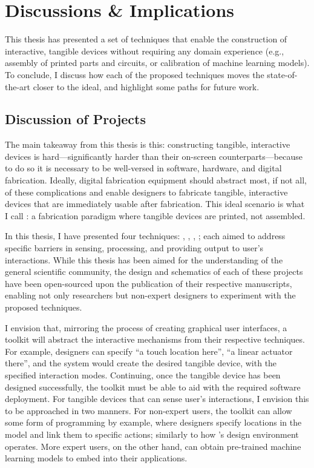 \chapter{Discussions \& Implications} \label{ch:discussion}
  This thesis has presented a set of techniques that enable the construction of
  interactive, tangible devices without requiring any domain experience (e.g.,
  assembly of printed parts and circuits, or calibration of machine learning
  models). To conclude, I discuss how each of the proposed techniques moves
  the state-of-the-art closer to the \papf ideal, and highlight some paths for
  future work.

  \section{Discussion of Projects}
    The main takeaway from this thesis is this: constructing tangible,
    interactive devices is hard---significantly harder than their on-screen
    counterparts---because to do so it is necessary to be well-versed in
    software, hardware, and digital fabrication. Ideally, digital fabrication
    equipment should abstract most, if not all, of these complications and
    enable designers to fabricate tangible, interactive devices that are
    immediately usable after fabrication. This ideal scenario is what I call
    \emph{\papf}: a fabrication paradigm where tangible devices are printed, not
    assembled.

    In this thesis, I have presented four \pap techniques: \al, \bh, \al,
    \mp; each aimed to address specific barriers in sensing, processing, and
    providing output to user's interactions. While this thesis has been aimed
    for the understanding of the general scientific community, the design and
    schematics of each of these projects have been open-sourced upon the
    publication of their respective manuscripts, enabling not only researchers
    but non-expert designers to experiment with the proposed techniques.

    I envision that, mirroring the process of creating graphical user
    interfaces, a \papf toolkit will abstract the interactive mechanisms from
    their respective techniques. For example, designers can specify ``a touch
    location here'', ``a linear actuator there'', and the system would create
    the desired tangible device, with the specified interaction modes.
    Continuing, once the tangible device has been designed successfully, the
    toolkit must be able to aid with the required software deployment. For
    tangible devices that can sense user's interactions, I envision this to be
    approached in two manners. For non-expert users, the \papf toolkit can
    allow some form of programming by example, where designers specify locations
    in the model and link them to specific actions; similarly to how \bh's
    design environment operates. More expert users, on the other hand, can
    obtain pre-trained machine learning models to embed into their applications.


